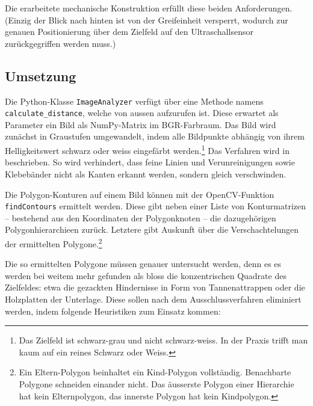 Die erarbeitete mechanische Konstruktion erfüllt diese beiden Anforderungen. (Einzig der Blick nach hinten ist von der Greifeinheit versperrt, wodurch zur genauen Positionierung über dem Zielfeld auf den Ultraschallsensor zurückgegriffen werden muss.)

\subsection{Umsetzung}

Die Python-Klasse \texttt{ImageAnalyzer} verfügt über eine Methode namens \texttt{calculate\_distance}, welche von aussen aufzurufen ist. Diese erwartet als Parameter ein Bild als NumPy-Matrix im BGR-Farbraum. Das Bild wird zunächst in Graustufen umgewandelt, indem alle Bildpunkte abhängig von ihrem Helligkeitswert schwarz oder weiss eingefärbt werden.\footnote{Das Zielfeld ist schwarz-grau und nicht schwarz-weiss. In der Praxis trifft man kaum auf ein reines Schwarz oder Weiss.} Das Verfahren wird in  beschrieben. So wird verhindert, dass feine Linien und Verunreinigungen sowie Klebebänder nicht als Kanten erkannt werden, sondern gleich verschwinden.

Die Polygon-Konturen auf einem Bild können mit der OpenCV-Funktion \texttt{findContours} ermittelt werden. Diese gibt neben einer Liste von Konturmatrizen -- bestehend aus den Koordinaten der Polygonknoten -- die dazugehörigen Polygonhierarchieen zurück. Letztere gibt Auskunft über die Verschachtelungen der ermittelten Polygone.\footnote{Ein Eltern-Polygon beinhaltet ein Kind-Polygon vollständig. Benachbarte Polygone schneiden einander nicht. Das äusserste Polygon einer Hierarchie hat kein Elternpolygon, das innerste Polygon hat kein Kindpolygon.}

Die so ermittelten Polygone müssen genauer untersucht werden, denn es es werden bei weitem mehr gefunden als bloss die konzentrischen Quadrate des Zielfeldes: etwa die gezackten Hindernisse in Form von Tannenattrappen oder die Holzplatten der Unterlage. Diese sollen nach dem Ausschlussverfahren eliminiert werden, indem folgende Heuristiken zum Einsatz kommen:

